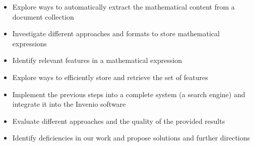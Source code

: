 \begin{itemize}
\item Explore ways to automatically extract the mathematical content from a document collection
\item Investigate different approaches and formats to store mathematical expressions
\item Identify relevant features in a mathematical expression 
\item Explore ways to efficiently store and retrieve the set of features
\item Implement the previous steps into a complete system (a search engine) and integrate it into the Invenio software
\item Evaluate different approaches and the quality of the provided results
\item Identify deficiencies in our work and propose solutions and further directions
\end{itemize}